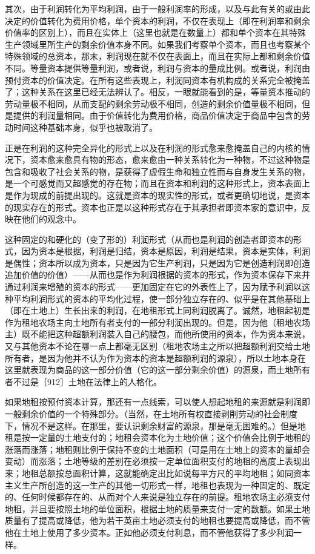其次，由于利润转化为平均利润，由于一般利润率的形成，以及与此有关的或由此决定的价值转化为费用价格，单个资本的利润，不仅在表现上（即在利润率和剩余价值率的区别上），而且在实体上（这里也就是在数量上）都和单个资本在其特殊生产领域里所生产的剩余价值本身不同。如果我们考察单个资本，而且也考察某个特殊领域的总资本，那末，利润现在就不仅在表面上，而且在实际上都和剩余价值不同。等量资本提供等量利润，或者说，利润与资本的量成比例。或者说，利润由预付资本的价值决定。在所有这些表现上，利润同资本有机构成的关系完全被掩盖了；这种关系在这里已经无法辨认了。相反，一眼就能看到的是，等量资本推动的劳动量极不相同，从而支配的剩余劳动极不相同，创造的剩余价值量极不相同，但是提供的利润量相同。由于价值转化为费用价格，商品价值决定于商品中包含的劳动时间这种基础本身，似乎也被取消了。

正是在利润的这种完全异化的形式上以及在利润的形式愈来愈掩盖自己的内核的情况下，资本愈来愈具有物的形态，愈来愈由一种关系转化为一种物，不过这种物是包含和吸收了社会关系的物，是获得了虚假生命和独立性而与自身发生关系的物，是一个可感觉而又超感觉的存在物；而且在资本和利润的这种形式上，资本表面上是作为现成的前提出现的。这就是资本的现实性的形式，或者更确切地说，是资本的现实存在的形式。资本也正是以这种形式存在于其承担者即资本家的意识中，反映在他们的观念中。

这种固定的和硬化的（变了形的）利润形式（从而也是利润的创造者即资本的形式，因为资本是根据，利润是归结，资本是原因，利润是结果，资本是实体，利润是偶性；资本所以成为资本，只是因为它生产利润，只是因为它是创造利润即创造追加价值的价值）——从而也是作为利润根据的资本的形式，作为资本保存下来并通过利润来增殖的资本的形式——更加固定在它的外表性上了，因为赋予利润以这种平均利润形式的资本的平均化过程，使一部分独立存在的、似乎是在其他基础上（即在土地上）生长出来的利润，在地租形式上同利润脱离了。诚然，地租起初是作为租地农场主向土地所有者支付的一部分利润出现的。但是，因为他（租地农场主）既不能把这种超额利润装入自己的腰包，而他所使用的资本，作为资本来说，又与其他资本不论在哪一点上都毫无区别（租地农场主之所以把超额利润交给土地所有者，是因为他并不认为作为资本的资本是超额利润的源泉），所以土地本身在这里就表现为商品的这一部分价值（它的这一部分剩余价值）的源泉，而土地所有者不过是［912］土地在法律上的人格化。

如果地租按预付资本计算，那还有一点线索，可以使人想起地租的来源就是利润即一般剩余价值的一个特殊部分。（当然，在土地所有权直接剥削劳动的社会制度下，情况不是这样。在那里，要认识剩余财富的源泉，那是毫无困难的。）但是地租是按一定量的土地支付的；地租会资本化为土地价值；这个价值会比例于地租的涨落而涨落；地租则比例于保持不变的土地面积（可是用在土地上的资本的量却会变动）而涨落；土地等级的差别在必须按一定单位面积支付的地租的高度上表现出来；地租总额按总面积计算，这就能确定出比如说每平方尺的平均地租；如同资本主义生产所创造的这一生产的其他一切形式一样，地租也表现为一种固定的、既定的、任何时候都存在的、从而对个人来说是独立存在的前提。租地农场主必须支付地租，并且要按照土地的单位面积，根据土地的质量来支付一定的数额。如果土地质量有了提高或降低，他为若干英亩土地必须支付的地租也要提高或降低，而不管他在土地上使用了多少资本。正如他必须支付利息，而不管他获得了多少利润一样。


